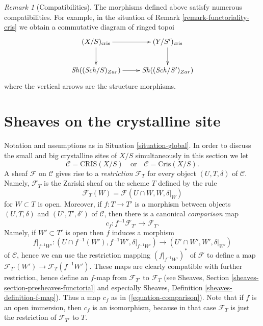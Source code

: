 \documentclass{stacks-project}
\theoremstyle{plain}
\theoremstyle{definition}
\theoremstyle{remark}
\newtheorem{remark}[subsection]{Remark}
\numberwithin{equation}{subsection}
\def\Sch{\mathit{Sch}}
\def\Sh{\mathop{\mathit{Sh}}\nolimits}
\begin{document}
\begin{remark}[Compatibilities]
\label{remark-compatibilities}
The morphisms defined above satisfy numerous compatibilities. For example,
in the situation of Remark \ref{remark-functoriality-cris}
we obtain a commutative diagram of ringed topoi
$$
\xymatrix{
(X/S)_{\text{cris}} \ar[d] \ar[r] & (Y/S')_{\text{cris}} \ar[d] \\
\Sh((\Sch/S)_{Zar}) \ar[r] & \Sh((\Sch/S')_{Zar})
}
$$
where the vertical arrows are the structure morphisms.
\end{remark}



\section{Sheaves on the crystalline site}
\label{section-sheaves}

\noindent
Notation and assumptions as in Situation \ref{situation-global}.
In order to discuss the small and big crystalline sites of $X/S$
simultaneously in this section we let
$$
\mathcal{C} = \text{CRIS}(X/S)
\quad\text{or}\quad
\mathcal{C} = \text{Cris}(X/S).
$$
A sheaf $\mathcal{F}$ on $\mathcal{C}$ gives rise to
a {\it restriction} $\mathcal{F}_T$ for every object $(U, T, \delta)$
of $\mathcal{C}$. Namely, $\mathcal{F}_T$ is the Zariski sheaf on
the scheme $T$ defined by the rule
$$
\mathcal{F}_T(W) = \mathcal{F}(U \cap W, W, \delta|_W)
$$
for $W \subset T$ is open. Moreover, if $f : T \to T'$ is a morphism
between objects
$(U, T, \delta)$ and $(U', T', \delta')$ of $\mathcal{C}$, then there
is a canonical {\it comparison} map
\begin{equation}
\label{equation-comparison}
c_f : f^{-1}\mathcal{F}_{T'} \longrightarrow \mathcal{F}_T.
\end{equation}
Namely, if $W' \subset T'$ is open then $f$ induces a morphism
$$
f|_{f^{-1}W'} :
(U \cap f^{-1}(W'), f^{-1}W', \delta|_{f^{-1}W'})
\longrightarrow
(U' \cap W', W', \delta|_{W'})
$$
of $\mathcal{C}$, hence we can use the restriction mapping
$(f|_{f^{-1}W'})^*$ of $\mathcal{F}$ to define a map
$\mathcal{F}_{T'}(W') \to \mathcal{F}_T(f^{-1}W')$.
These maps are clearly compatible with further restriction, hence
define an $f$-map from $\mathcal{F}_{T'}$ to $\mathcal{F}_T$ (see
Sheaves, Section \ref{sheaves-section-presheaves-functorial}
and especially
Sheaves, Definition \ref{sheaves-definition-f-map}).
Thus a map $c_f$ as in (\ref{equation-comparison}).
Note that if $f$ is an open immersion, then $c_f$ is an
isomorphism, because in that case $\mathcal{F}_T$ is just
the restriction of $\mathcal{F}_{T'}$ to $T$.
\end{document}
